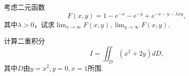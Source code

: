 \documentclass{oxmathproblems}
\begin{document}
\begin{questions}

\miquestion
考虑二元函数
$$
F(x,y) = 
  1 - e^{-x} - e^{-y} + e^{-x-y-\lambda xy},
$$
其中$\lambda > 0$，试求$\lim_{x \to \infty} F(x,y), \lim_{y \to \infty} F(x,y)$.


\miquestion
计算二重积分
$$I = \iint_{D} (x^2 + 2y) dD,$$
其中$D$由$y = x^2, y = 0, x = 1$所围.
\end{questions}
\end{document}
